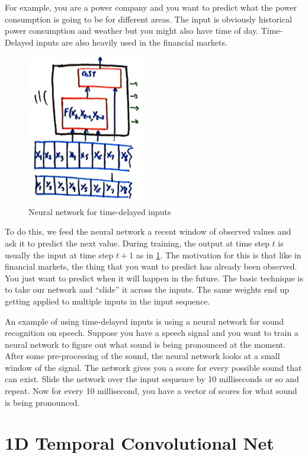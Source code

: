For example, you are a power company and you want to predict what the power consumption is going to be for different areas. 
The input is obviously historical power consumption and weather but you might also have time of day. 
Time-Delayed inputs are also heavily used in the financial markets. 

\begin{figure}
    \centering
    \includegraphics[width=150pt]{lectures/03-a/images/td_inputs.png}
    \caption{Neural network for time-delayed inputs}
    \label{fig:td_inputs}
\end{figure}

To do this, we feed the neural network a recent window of observed values and ask it to predict the next value. 
During training, the output at time step $t$ is usually the input at time step $t+1$ as in \cref{fig:td_inputs}. 
The motivation for this is that like in financial markets, the thing that you want to predict has already been observed. 
You just want to predict when it will happen in the future. 
The basic technique is to take our network and ``slide'' it across the inputs. 
The same weights end up getting applied to multiple inputs in the input sequence. 

An example of using time-delayed inputs is using a neural network for sound recognition on speech. 
Suppose you have a speech signal and you want to train a neural network to figure out what sound is being pronounced at the moment. 
After some pre-processing of the sound, the neural network looks at a small window of the signal. 
The network gives you a score for every possible sound that can exist. 
Slide the network over the input sequence by 10 milliseconds or so and repeat. 
Now for every 10 millisecond, you have a vector of scores for what sound is being pronounced.

\section{1D Temporal Convolutional Net}

